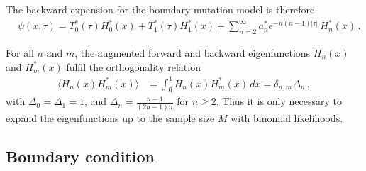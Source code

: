 \documentclass[preprint]{elsarticle}
\begin{document}
{The backward expansion for the boundary mutation model is therefore
\begin{equation}\label{eq:backw_expansion_boundary}
\begin{split}
    &\psi(x,\tau)=T_0^{*}(\tau)H_0^{*}(x)+ T_1^{*}(\tau)H_1^{*}(x)+\sum_{n=2}^\infty a_n^{*} e^{-n(n-1) |\tau|}\,H_n^{*}(x)\,.
\end{split}
\end{equation}

For all $n$ and $m$, the augmented forward and backward eigenfunctions $H_n(x)$ and $H_m^{*}(x)$ fulfil the orthogonality relation 
\begin{equation}
\begin{split}
    \langle H_n(x)H_m^{*}(x)\rangle&= \int_0^1 H_n(x)H_m^{*}(x)\,dx=\delta_{n,m}\Delta_n\,,
\end{split}
\end{equation}
with $\Delta_0=\Delta_1=1$, and $\Delta_n=\frac{n-1}{(2n-1)n}$ for $n\geq 2$. Thus it is only necessary to expand the eigenfunctions up to the sample size $M$ with binomial likelihoods. 

\subsection{Boundary condition}\label{section:is_adjoint?}

}
\end{document}
